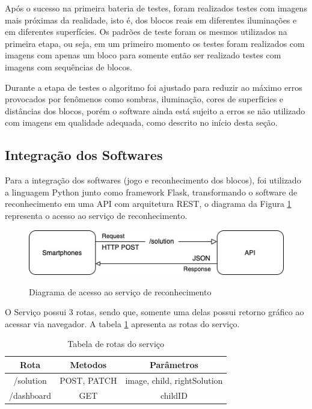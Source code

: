     Após o sucesso na primeira bateria de testes, foram realizados testes com imagens mais próximas da realidade, isto é, dos blocos reais em diferentes iluminações e em diferentes superfícies. Os padrões de teste foram os mesmos utilizados na primeira etapa, ou seja, em um primeiro momento os testes foram realizados com imagens com apenas um bloco para somente então ser realizado testes com imagens com sequências de blocos.
    
    Durante a etapa de testes o algoritmo foi ajustado para reduzir ao máximo erros provocados por fenômenos como sombras, iluminação, cores de superfícies e distâncias dos blocos, porém o software ainda está sujeito a erros se não utilizado com imagens em qualidade adequada, como descrito no início desta seção.    

    \subsection {Integração dos Softwares}
    
    Para a integração dos softwares (jogo e reconhecimento dos blocos), foi utilizado a linguagem Python junto como framework Flask, transformando o software de reconhecimento em uma API com arquitetura REST, o diagrama da Figura \ref{figura:diagrama_acesso_integracao} representa o acesso ao serviço de reconhecimento.
    
    \begin{figure}[H]
        \caption{Diagrama de acesso ao serviço de reconhecimento}
        \centering
        \includegraphics[width=15cm]{Imagens/Cap4/diagrama_acesso_integracao.jpg}
        \label{figura:diagrama_acesso_integracao}
    \end{figure}
    
    O Serviço possui 3 rotas, sendo que, somente uma delas possui retorno gráfico ao acessar via navegador. A tabela \ref{tab:rotas} apresenta as rotas do serviço.
    
    \begin{table}[H]
        \centering
        \caption{Tabela de rotas do serviço}
        \label{tab:rotas}
        \begin{tabular}{|c|c|c|}
            \hline
            {Rota} & {Metodos} & {Parâmetros}  \\ \hline
            /solution & POST, PATCH & image, child, rightSolution \\ \hline
            /dashboard & GET & childID \\ \hline
        \end{tabular}
    \end{table}
    
